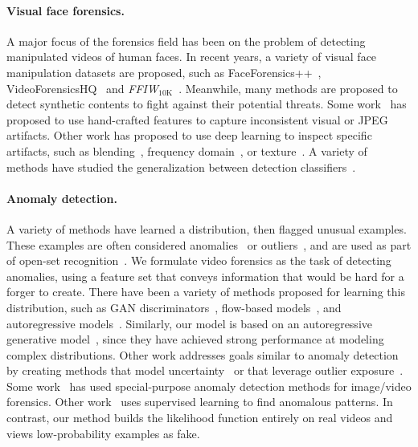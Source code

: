 \documentclass[10pt,twocolumn,letterpaper]{article}
\newcommand{\mypar}[1]{\vspace{-3mm}\paragraph{#1}}
\begin{document}
\mypar{Visual face forensics.} A major focus of the forensics field has been on the problem of detecting manipulated videos of human faces. In recent years, a variety of visual face manipulation datasets are proposed, such as FaceForensics++~\cite{rossler2019faceforensics++}, VideoForensicsHQ~\cite{fox2021videoforensicshq} and \textit{FFIW}$_{\text{10K}}$~\cite{zhou2021face}. Meanwhile, many methods are proposed to detect synthetic contents to fight against their potential threats. Some work~\cite{bianchi2012image, li2018exposing, guo2022eyes} has proposed to use hand-crafted features to capture inconsistent visual or JPEG artifacts. Other work has proposed to use deep learning to inspect specific artifacts, such as blending~\cite{li2020face}, frequency domain~\cite{qian2020thinking, durall2020watch, frank2020leveraging}, or texture~\cite{liu2020global}. A variety of methods have studied the generalization between detection classifiers~\cite{wang2019cnn,chai2020makes}.
 




















\mypar{Anomaly detection.} 
A variety of methods have learned a distribution, then flagged unusual examples. These examples are often considered anomalies~\cite{zong2018deep, schlegl2017unsupervised, zenati2018adversarially,liu2019generative} or outliers~\cite{sabokrou2018adversarially, pidhorskyi2018generative}, and are used as part of open-set recognition~\cite{kong2021opengan, zhang2020hybrid}. 
We formulate video forensics as the task of detecting anomalies, using a feature set that conveys information that would be hard for a forger to create. There have been a variety of methods proposed for learning this distribution, such as  GAN discriminators~\cite{schlegl2017unsupervised,sabokrou2018adversarially,pidhorskyi2018generative,zenati2018adversarially,liu2019generative,kong2021opengan,zong2018deep,NIPS2014_5ca3e9b1}, flow-based models~\cite{zhang2020hybrid}, and autoregressive models~\cite{song2017pixeldefend}. Similarly, our model is based on an autoregressive generative model~\cite{radford2019language,bengio2000neural}, since they have achieved strong performance at modeling complex distributions. Other work addresses goals similar to anomaly detection by creating methods that model uncertainty~\cite{liang2017enhancing} or that leverage outlier exposure~\cite{dhamija2018reducing,ruff2019deep,hendrycks2018deep}. Some work~\cite{huh2018fighting,cozzolino2016single,kalyan2018satellite,d2017autoencoder,bondi2017tampering,khalid2020oc,perez2019deep} has used special-purpose anomaly detection methods for image/video forensics. Other work~\cite{fei2022learning,zhao2021learning,wu2019mantra,hu2021dynamic} uses supervised learning to find anomalous patterns. In contrast, our method builds the likelihood function entirely on real videos and views low-probability examples as fake. 
\end{document}
